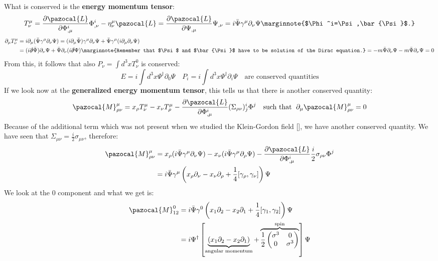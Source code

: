 \documentclass[../main.tex]{subfiles}
\begin{document}
What is conserved is the \textbf{energy momentum tensor}:
\[
T^\mu_\nu=\frac{\partial\pazocal{L}}{\partial\Phi^i_{,\mu}}\Phi^i_{,\nu}-\eta^\mu_\nu\pazocal{L}=\frac{\partial\pazocal{L}}{\partial\Psi_{,\mu}}\Psi_{,\nu}=i\bar{\Psi}\gamma^\mu\partial_\nu\Psi\marginnote{$\Phi^i=\Psi,\bar{\Psi}$.}
\]
\begin{align*}
\partial_\mu T^\mu_\nu&=i\partial_\mu(\bar{\Psi}\gamma^\mu\partial_\nu\Psi)=(i\partial_\mu\bar{\Psi})\gamma^\mu\partial_\nu\Psi+\bar{\Psi}\gamma^\mu(i\partial_\mu\partial_\nu\Psi)\\
&=(i\slashed{\partial}\bar{\Psi})\partial_\nu\Psi+\bar{\Psi}\partial_\nu(i\slashed{\partial}\Psi)\marginnote{Remember that $\Psi$ and $\bar{\Psi}$ have to be solution of the Dirac equation.}
=-m\bar{\Psi}\partial_\nu\Psi-m\bar{\Psi}\partial_\nu\Psi=0
\end{align*}
From this, it follows that also $P_\nu=\int d^3x T^0_\nu$ is conserved:
\[
E=i\int d^3x\Psi^\dagger\partial_0\Psi \quad P_i=i\int d^3x\Psi^\dagger\partial_i\Psi \quad \text{are conserved quantities}
\]
If we look now at the \textbf{generalized energy momentum tensor}, this tells us that there is another conserved quantity:
\[
\pazocal{M}^\mu_{\rho\nu}=x_\rho T^\mu_\nu-x_\nu T^\mu_\rho-\frac{\partial\pazocal{L}}{\partial\Phi^i_{,\mu}}(\Sigma_{\rho\nu})^i_j\Phi^j \quad \text{such that }\;\partial_\mu\pazocal{M}^\mu_{\rho\nu}=0
\]
Because of the additional term which was not present when we studied the Klein-Gordon field [], we have another conserved quantity. We have seen that $\Sigma_{\mu\nu}=\frac{i}{2}\sigma_{\mu\nu}$, therefore:
\begin{align*}
\pazocal{M}^\mu_{\rho\nu}&=x_\rho(i\bar{\Psi}\gamma^\mu\partial_\nu\Psi)-x_\nu(i\bar{\Psi}\gamma^\mu\partial_\rho\Psi)-\frac{\partial\pazocal{L}}{\partial\Phi^i_{,\mu}}\frac{i}{2}\sigma_{\rho\nu}\Phi^j\\
&=i\bar{\Psi}\gamma^\mu\left(x_\rho\partial_\nu-x_\nu\partial_\rho+\frac{1}{4}[\gamma_\rho,\gamma_\nu]\right)\Psi
\end{align*}
We look at the 0 component and what we get is:
\begin{align*}
\pazocal{M}^0_{12}&=i\bar{\Psi}\gamma^0\left(x_1\partial_2-x_2\partial_1+\frac{1}{4}[\gamma_1,\gamma_2]\right)\Psi\\
&=i\Psi^\dagger\left[\underbrace{(x_1\partial_2-x_2\partial_1)}_{\text{angular momentum}}+\overbrace{\frac{1}{2}\begin{pmatrix}\sigma^3 & 0 \\ 0 & \sigma^3\end{pmatrix}}^{\text{spin}}\right]\Psi
\end{align*}
\end{document}
